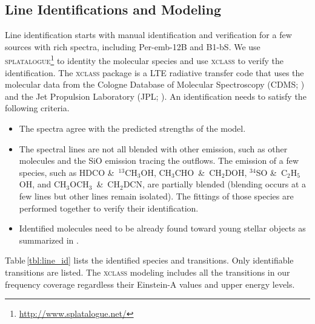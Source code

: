 \documentclass[twocolumn]{aastex62}
\newcommand{\tmethanol}{\mbox{$^{13}$CH$_{3}$OH}}
\newcommand{\dmethanol}{\mbox{CH$_{2}$DOH}}
\newcommand{\dimethylether}{\mbox{CH$_{3}$OCH$_{3}$}}
\newcommand{\ethanol}{\mbox{C$_{2}$H$_{5}$OH}}
\newcommand{\acetaldehyde}{\mbox{CH$_{3}$CHO}}
\newcommand{\dmethylcyanide}{\mbox{CH$_{2}$DCN}}
\begin{document}
\subsection{Line Identifications and Modeling}
\label{sec:modeling}
Line identification starts with manual identification and verification for a few sources with rich spectra, including Per-emb-12B and B1-bS.  We use \textsc{splatalogue}\footnote{\href{http://www.splatalogue.net/}{http://www.splatalogue.net/}} to identity the molecular species and use \textsc{xclass} \citep{2017A&A...598A...7M} to verify the identification.  The \textsc{xclass} package is a LTE radiative transfer code that uses the molecular data from the Cologne Database of Molecular Spectroscopy (CDMS; \citealt{2001A&A...370L..49M,2005JMoSt.742..215M,2016JMoSp.327...95E}) and the Jet Propulsion Laboratory (JPL; \citealt{1998JQSRT..60..883P}).  An identification needs to satisfy the following criteria.
\begin{itemize}
  \item The spectra agree with the predicted strengths of the model.
  \item The spectral lines are not all blended with other emission, such as other molecules and the SiO emission tracing the outflows.  The emission of a few species, such as HDCO \&\ \tmethanol, \acetaldehyde\ \&\ \dmethanol, $^{34}$SO \&\ \ethanol, and \dimethylether\ \&\ \dmethylcyanide, are partially blended (blending occurs at a few lines but other lines remain isolated).  The fittings of those species are performed together to verify their identification.
  \item Identified molecules need to be already found toward young stellar objects as summarized in \citet{2018ApJS..239...17M}. 
\end{itemize}
Table\,\ref{tbl:line_id} lists the identified species and transitions.  Only identifiable transitions are listed.  The \textsc{xclass} modeling includes all the transitions in our frequency coverage regardless their Einstein-A values and upper energy levels.  
\end{document}
